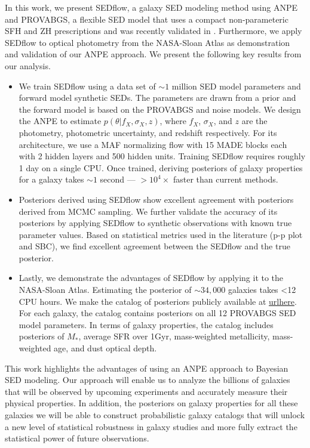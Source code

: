 In this work, we present {\sc SEDflow}, a galaxy SED modeling method using ANPE
and PROVABGS, a flexible SED model that uses a compact non-parameteric SFH and
ZH prescriptions and was recently validated in \cite{hahn2022}.
Furthermore, we apply {\sc SEDflow} to optical photometry from the NASA-Sloan
Atlas as demonstration and validation of our ANPE approach.  
We present the following key results from our analysis.
\begin{itemize}
    \item We train {\sc SEDflow} using a data set of ${\sim}1$ million SED
        model parameters and forward model synthetic SEDs.
        The parameters are drawn from a prior and the forward model is based on
        the PROVABGS and noise models. 
        We design the ANPE to estimate $p(\theta | f_X, \sigma_X, z)$, where
        $f_X$, $\sigma_X$, and $z$ are the photometry, photometric uncertainty,
        and redshift respectively. 
        For its architecture, we use a MAF normalizing flow with 15 MADE blocks
        each with 2 hidden layers and 500 hidden units.
        Training {\sc SEDflow} requires roughly 1 day on a single CPU. 
        Once trained, deriving posteriors of galaxy properties for a galaxy
        takes ${\sim}1$ second --- $>10^4\times$ faster than current 
        methods.
    \item Posteriors derived using {\sc SEDflow} show excellent agreement with
        posteriors derived from MCMC sampling. 
        We further validate the accuracy of its posteriors by applying  {\sc
        SEDflow} to synthetic observations with known true parameter values.  
        Based on statistical metrics used in the literature (p-p plot and SBC),
        we find excellent agreement between the {\sc SEDflow} and the true
        posterior. 
    \item Lastly, we demonstrate the advantages of {\sc SEDflow} by applying it
        to the NASA-Sloan Atlas.
        Estimating the posterior of ${\sim}34,000$ galaxies takes <12 CPU hours. 
        We make the catalog of posteriors publicly available at \url{urlhere}. 
        For each galaxy, the catalog contains posteriors on all 12 PROVABGS
        SED model parameters.
        In terms of galaxy properties, the catalog includes posteriors of
        $M_*$, average SFR over 1Gyr, mass-weighted metallicity, mass-weighted
        age, and dust optical depth. 
\end{itemize}

This work highlights the advantages of using an ANPE approach to Bayesian SED
modeling.  
Our approach will enable us to analyze the billions of galaxies that will be
observed by upcoming experiments and accurately measure their physical
properties. 
In addition, the posteriors on galaxy properties for all these galaxies we will
be able to construct probabilistic galaxy catalogs that will unlock a new level
of statistical robustness in galaxy studies and more fully extract the
statistical power of future observations.

